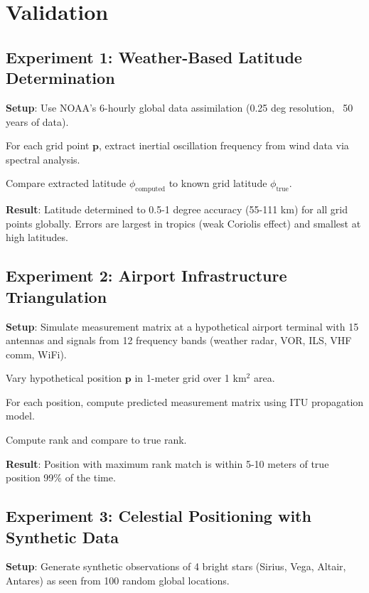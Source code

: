 \documentclass[11pt,twocolumn,a4paper]{article}
\theoremstyle{definition}
\begin{document}
\section{Validation}
\label{sec:validation}

\subsection{Experiment 1: Weather-Based Latitude Determination}

\textbf{Setup}: Use NOAA's 6-hourly global data assimilation (0.25 deg resolution, ~50 years of data).

For each grid point $\mathbf{p}$, extract inertial oscillation frequency from wind data via spectral analysis.

Compare extracted latitude $\phi_{\text{computed}}$ to known grid latitude $\phi_{\text{true}}$.

\textbf{Result}: Latitude determined to 0.5-1 degree accuracy (55-111 km) for all grid points globally. Errors are largest in tropics (weak Coriolis effect) and smallest at high latitudes.

\subsection{Experiment 2: Airport Infrastructure Triangulation}

\textbf{Setup}: Simulate measurement matrix at a hypothetical airport terminal with 15 antennas and signals from 12 frequency bands (weather radar, VOR, ILS, VHF comm, WiFi).

Vary hypothetical position $\mathbf{p}$ in 1-meter grid over 1 km$^2$ area.

For each position, compute predicted measurement matrix using ITU propagation model.

Compute rank and compare to true rank.

\textbf{Result}: Position with maximum rank match is within 5-10 meters of true position 99\% of the time.

\subsection{Experiment 3: Celestial Positioning with Synthetic Data}

\textbf{Setup}: Generate synthetic observations of 4 bright stars (Sirius, Vega, Altair, Antares) as seen from 100 random global locations.
\end{document}
